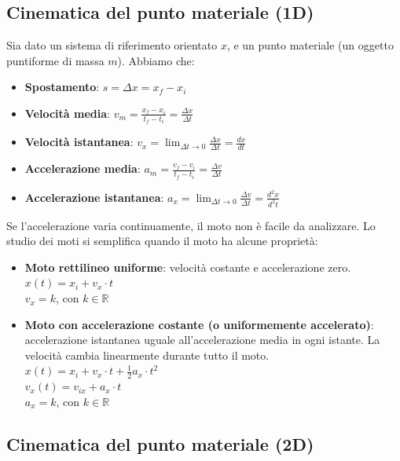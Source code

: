 \documentclass[12pt, a4paper]{article}
\begin{document}
\subsection{Cinematica del punto materiale (1D)}

Sia dato un sistema di riferimento orientato $x$, e un punto materiale (un oggetto puntiforme di massa $m$). Abbiamo che:
\begin{itemize}
	\item \textbf{Spostamento}: $s = \Delta x = x_f - x_i$
	\item \textbf{Velocità media}: $v_m =\frac{x_f - x_i}{t_f - t_i} = \frac{\Delta x}{\Delta t}$
	\item \textbf{Velocità istantanea}: $v_x = \lim_{\Delta t \to 0}{\frac{\Delta x}{\Delta t}} = \frac{dx}{dt}$
	\item \textbf{Accelerazione media}: $a_m = \frac{v_f - v_i}{t_f - t_i}= \frac{\Delta v}{\Delta t}$
	\item \textbf{Accelerazione istantanea}: $a_x = \lim_{\Delta t \to 0}{\frac{\Delta v}{\Delta t}} = \frac{d^2x}{d^2t}$
\end{itemize}

\noindent
Se l'accelerazione varia continuamente, il moto non è facile da analizzare. Lo studio dei moti si semplifica quando il moto ha alcune proprietà:
\begin{itemize}
	\item \textbf{Moto rettilineo uniforme}: velocità costante e accelerazione zero. \\
	      $x(t) = x_i + v_x \cdot t$\\
	      $v_x = k$, con $k \in \mathbb{R}$
	\item \textbf{Moto con accelerazione costante (o uniformemente accelerato)}: accelerazione istantanea uguale all'accelerazione media in ogni istante. La velocità cambia linearmente durante tutto il moto.\\
	      $x(t) = x_i + v_x \cdot t + \frac{1}{2} a_x \cdot t^2$ \\
	      $v_x (t) = v_{ix} + a_x \cdot t$ \\
	      $a_x = k$, con $k \in \mathbb R$
\end{itemize}

\subsection{Cinematica del punto materiale (2D)}
\end{document}
